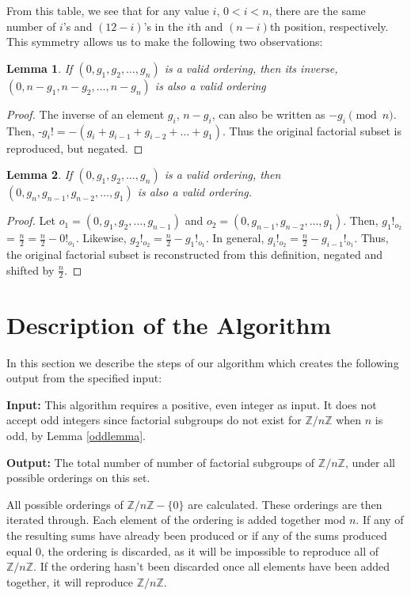\documentclass{article}
\newcommand{\ZZ}{\mathbb{Z}}
\newcommand{\ZnZ}{\ZZ/n\ZZ}
\newtheorem{lemma}{Lemma}
\begin{document}
From this table, we see that for any value $i$, $0<i<n$, there are the same number of $i$'s and $(12-i)$'s in the $i$th and $(n-i)$th position, respectively. This symmetry allows us to make the following two observations:
\begin{lemma}
If $(0,g_1,g_2,\ldots,g_n)$ is a valid ordering, then its inverse, $(0, n-g_1, n-g_2, \ldots, n-g_n)$ is also a valid ordering
\end{lemma}
\begin{proof}
The inverse of an element $g_i$, $n-g_i$, can also be written as $-g_i\pmod{n}$. Then, -$g_i! = -(g_i + g_{i-1} + g_{i-2} + \ldots + g_1)$. Thus the original factorial subset is reproduced, but negated. 
\end{proof}
\begin{lemma}
If $(0, g_1, g_2, \ldots, g_n)$ is a valid ordering, then $(0, g_n, g_{n-1}, g_{n-2}, \ldots, g_1)$ is also a valid ordering.
\end{lemma}
\begin{proof}
Let $o_1 = (0,g_1, g_2, \ldots, g_{n-1})$ and $o_2 = (0, g_{n-1}, g_{n-2}, \ldots, g_1)$. Then, $g_1!_{o_2}$ = $\frac{n}{2} = \frac{n}{2} - 0!_{o_1}$. Likewise, $g_2!_{o_2} = \frac{n}{2}-g_1!_{o_1}$. In general, $g_i!_{o_2} = \frac{n}{2} - g_{i-1}!_{o_1}$. Thus, the original factorial subset is reconstructed from this definition, negated and shifted by $\frac{n}{2}$.  
\end{proof}

\section{Description of the Algorithm}

In this section we describe the steps of our algorithm which creates the following output from the specified input:

\noindent\textbf{Input:} This algorithm requires a positive, even integer as input. It does not accept odd integers since factorial subgroups do not exist for $\ZnZ$ when $n$ is odd, by Lemma \ref{oddlemma}.

\noindent\textbf{Output:} The total number of number of factorial subgroups of $\ZnZ$, under all possible orderings on this set.

All possible orderings of $\ZnZ-\{0\}$ are calculated. These orderings are then iterated through. Each element of the ordering is added together mod $n$. If any of the resulting sums have already been produced or if any of the sums produced equal 0, the ordering is discarded, as it will be impossible to reproduce all of $\ZnZ$. If the ordering hasn't been discarded once all elements have been added together, it will reproduce $\ZnZ$.
\end{document}
